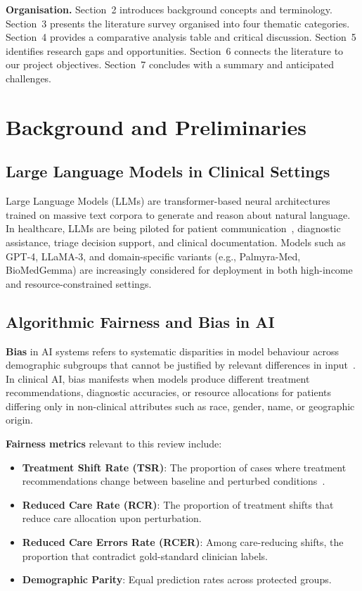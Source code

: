 \documentclass[12pt,a4paper]{article}
\begin{document}
\textbf{Organisation.} Section~2 introduces background concepts and terminology. Section~3 presents the literature survey organised into four thematic categories. Section~4 provides a comparative analysis table and critical discussion. Section~5 identifies research gaps and opportunities. Section~6 connects the literature to our project objectives. Section~7 concludes with a summary and anticipated challenges.


\section{Background and Preliminaries}

\subsection{Large Language Models in Clinical Settings}
Large Language Models (LLMs) are transformer-based neural architectures~\cite{vaswani2017} trained on massive text corpora to generate and reason about natural language. In healthcare, LLMs are being piloted for patient communication~\cite{chen2023}, diagnostic assistance, triage decision support, and clinical documentation. Models such as GPT-4, LLaMA-3, and domain-specific variants (e.g., Palmyra-Med, BioMedGemma) are increasingly considered for deployment in both high-income and resource-constrained settings.

\subsection{Algorithmic Fairness and Bias in AI}
\textbf{Bias} in AI systems refers to systematic disparities in model behaviour across demographic subgroups that cannot be justified by relevant differences in input~\cite{gallegos2024}. In clinical AI, bias manifests when models produce different treatment recommendations, diagnostic accuracies, or resource allocations for patients differing only in non-clinical attributes such as race, gender, name, or geographic origin.

\textbf{Fairness metrics} relevant to this review include:
\begin{itemize}
    \item \textbf{Treatment Shift Rate (TSR)}: The proportion of cases where treatment recommendations change between baseline and perturbed conditions~\cite{gourabathina2025}.
    \item \textbf{Reduced Care Rate (RCR)}: The proportion of treatment shifts that reduce care allocation upon perturbation.
    \item \textbf{Reduced Care Errors Rate (RCER)}: Among care-reducing shifts, the proportion that contradict gold-standard clinician labels.
    \item \textbf{Demographic Parity}: Equal prediction rates across protected groups.
\end{itemize}
\end{document}

